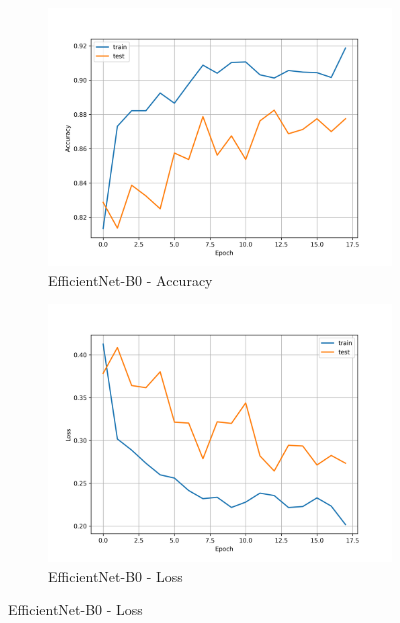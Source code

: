\documentclass[11pt]{article}
\begin{document}
\begin{figure}[H]
		\begin{subfigure}[b]{0.49\textwidth}
			\centering
			\includegraphics[width=\linewidth, trim=20 10 20 10, clip]{assets/accuracy_curve/efficientnet_b0_accuracy_curve.png}
			\caption{EfficientNet-B0 - Accuracy}
		\end{subfigure}
		\hfill
		\begin{subfigure}[b]{0.49\textwidth}
			\centering
			\includegraphics[width=\linewidth, trim=20 10 20 10, clip]{assets/loss_curve/efficientnet_b0_loss_curve.png}
			\caption{EfficientNet-B0 - Loss}
		\end{subfigure}
	\end{figure}
	
\end{document}

